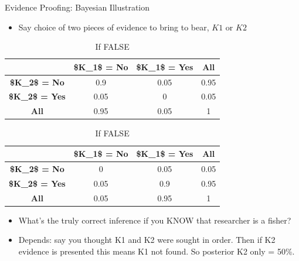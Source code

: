 \documentclass[
  11pt,
  ignorenonframetext,
]{beamer}
\providecommand{\tightlist}{%
  \setlength{\itemsep}{0pt}\setlength{\parskip}{0pt}}\usepackage{longtable,booktabs,array}
\begin{document}
\begin{frame}{Evidence Proofing: Bayesian Illustration}
\protect\hypertarget{evidence-proofing-bayesian-illustration-1}{}
\begin{itemize}
\tightlist
\item
  Say choice of two pieces of evidence to bring to bear, \(K1\) or
  \(K2\)
\end{itemize}

\begin{table}

\caption{Likelihoods}\begin{minipage}[t]{0.50\linewidth}
\subcaption{\label{tbl-anonymous-5905318-1}}

{\centering 

\caption{If TRUE }\tabularnewline

\centering
\begin{tabular}{>{}c|c|c|c}
\hline
 & \$K\_1\$ = No & \$K\_1\$ = Yes & All\\
\hline
\textbf{\$K\_2\$ = No} & 0.9 & 0.05 & 0.95\\
\hline
\textbf{\$K\_2\$ = Yes} & 0.05 & 0 & 0.05\\
\hline
\textbf{All} & 0.95 & 0.05 & 1\\
\hline
\end{tabular}

}

\end{minipage}%
%
\begin{minipage}[t]{0.50\linewidth}
\subcaption{\label{tbl-anonymous-5905318-2}}

{\centering 

\caption{If FALSE }\tabularnewline

\centering
\begin{tabular}{>{}c|c|c|c}
\hline
 & \$K\_1\$ = No & \$K\_1\$ = Yes & All\\
\hline
\textbf{\$K\_2\$ = No} & 0 & 0.05 & 0.05\\
\hline
\textbf{\$K\_2\$ = Yes} & 0.05 & 0.9 & 0.95\\
\hline
\textbf{All} & 0.05 & 0.95 & 1\\
\hline
\end{tabular}

}

\end{minipage}%

\end{table}

\begin{itemize}
\tightlist
\item
  What's the truly correct inference if you KNOW that researcher is a
  fisher?
\item
  Depends: say you thought K1 and K2 were sought in order. Then if K2
  evidence is presented this means K1 not found. So posterior
  \textbar K2 only = 50\%.
\end{itemize}
\end{frame}
\end{document}
